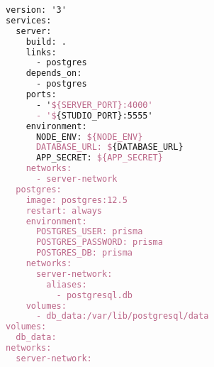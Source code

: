 \begin{lstlisting}[language=TeX, caption=Backend docker compose]
version: '3'
services:
  server:
    build: .
    links:
      - postgres
    depends_on:
      - postgres
    ports:
      - '${SERVER_PORT}:4000'
      - '${STUDIO_PORT}:5555'
    environment:
      NODE_ENV: ${NODE_ENV}
      DATABASE_URL: ${DATABASE_URL}
      APP_SECRET: ${APP_SECRET}
    networks:
      - server-network
  postgres:
    image: postgres:12.5
    restart: always
    environment:
      POSTGRES_USER: prisma
      POSTGRES_PASSWORD: prisma
      POSTGRES_DB: prisma
    networks:
      server-network:
        aliases:
          - postgresql.db
    volumes:
      - db_data:/var/lib/postgresql/data
volumes:
  db_data:
networks:
  server-network:
\end{lstlisting}


